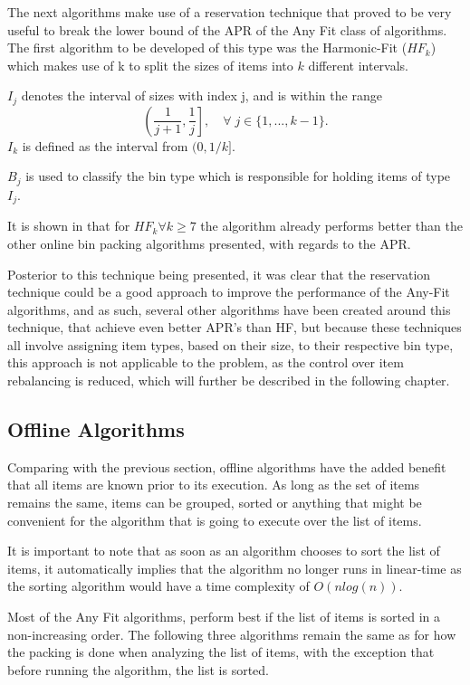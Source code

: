 The next algorithms make use of a reservation technique that proved to be very
useful to break the lower bound of the APR of the Any Fit class of algorithms.
The first algorithm to be developed of this type was the Harmonic-Fit ($HF_k$)
which makes use of k to split the sizes of items into $k$ different intervals.

$I_j$ denotes the interval of sizes with index j, and is within the range 
\begin{equation}
    \left (\frac{1}{j+1}, \frac{1}{j} \right], \quad \forall \; j \in \{1, ..., k-1\}.
\end{equation}
$I_k$ is defined as the interval from $(0, 1/k]$.

$B_j$ is used to classify the bin type which is responsible for holding items of
type $I_j$.

It is shown in \cite{lee1985simple} that for $HF_k \forall k \geq 7$ the
algorithm already performs better than the other online bin packing algorithms
presented, with regards to the APR.

Posterior to this technique being presented, it was clear that the reservation
technique could be a good approach to improve the performance of the Any-Fit
algorithms, and as such, several other algorithms have been created around this
technique, that achieve even better APR's than HF, but because these techniques
all involve assigning item types, based on their size, to their respective bin
type, this approach is not applicable to the problem, as the control over item
rebalancing is reduced, which will further be described in the following
chapter.

\subsection{Offline Algorithms}

Comparing with the previous section, offline algorithms have the added benefit
that all items are known prior to its execution. As long as the set of items
remains the same, items can be grouped, sorted or anything that might be
convenient for the algorithm that is going to execute over the list of items. 

It is important to note that as soon as an algorithm chooses to sort the list of
items, it automatically implies that the algorithm no longer runs in linear-time
as the sorting algorithm would have a time complexity of $O(n log(n))$.

Most of the Any Fit algorithms, perform best if the list of items is sorted in a
non-increasing order. The following three algorithms remain the same as for how
the packing is done when analyzing the list of items, with the exception that
before running the algorithm, the list is sorted.

